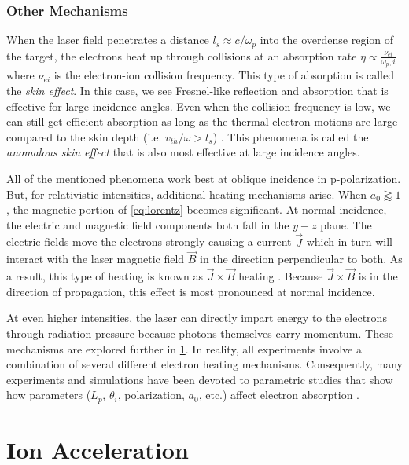 \subsubsection{Other Mechanisms}
When the laser field penetrates a distance $l_s \approx c / \omega_p$ into the overdense region of the target, the electrons heat up through collisions at an absorption rate $\eta \propto \frac{\nu_{ei}}{\omega_p,i}$ \cite{Gibbon_2005_Plasma} where $\nu_{ei}$ is the electron-ion collision frequency. This type of absorption is called the \emph{skin effect}. In this case, we see Fresnel-like reflection and absorption \cite{Griffiths_2017} that is effective for large incidence angles. Even when the collision frequency is low, we can still get efficient absorption as long as the thermal electron motions are large compared to the skin depth (i.e. $v_{th}/\omega > l_s$) \cite{Gibbon_2005_Plasma}. This phenomena is called the \emph{anomalous skin effect} that is also most effective at large incidence angles. 

All of the mentioned phenomena work best at oblique incidence in p-polarization. But, for relativistic intensities, additional heating mechanisms arise. When $a_0 \gtrapprox 1$, the magnetic portion of \cref{eq:lorentz} becomes significant. At normal incidence, the electric and magnetic field components both fall in the $y-z$ plane. The electric fields move the electrons strongly causing a current $\vec{J}$ which in turn will interact with the laser magnetic field $\vec{B}$ in the direction perpendicular to both. As a result, this type of heating is known as $\vec{J} \times \vec{B}$ heating \cite{Gibbon_2005_Plasma,Kruer_1985_PoF}. Because $\vec{J} \times \vec{B}$ is in the direction of propagation, this effect is most pronounced at normal incidence.

At even higher intensities, the laser can directly impart energy to the electrons through radiation pressure \cite{Macchi_2013_RevModPhys} because photons themselves carry momentum. These mechanisms are explored further in \cref{sec:acceleration}. In reality, all experiments involve a combination of several different electron heating mechanisms. Consequently, many experiments and simulations have been devoted to parametric studies that show how parameters ($L_p$, $\theta_i$, polarization, $a_0$, etc.) affect electron absorption \cite{Sheng_2015_CPB}.

\section{Ion Acceleration} \label{sec:acceleration}

